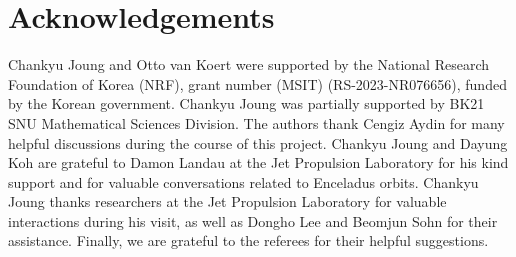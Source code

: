 \documentclass[pdflatex,sn-mathphys-ay]{sn-jnl}%
\theoremstyle{thmstyleone}%
\theoremstyle{thmstyletwo}%
\theoremstyle{thmstylethree}%
\begin{document}
\section*{Acknowledgements}
Chankyu Joung and Otto van Koert were supported by the National Research Foundation of Korea (NRF), grant number (MSIT) (RS-2023-NR076656), funded by the Korean government.
Chankyu Joung was partially supported by BK21 SNU Mathematical Sciences Division.
The authors thank Cengiz Aydin for many helpful discussions during the course of this project. 
Chankyu Joung and Dayung Koh are grateful to Damon Landau at the Jet Propulsion Laboratory for his kind support and for valuable conversations related to Enceladus orbits. 
Chankyu Joung thanks researchers at the Jet Propulsion Laboratory for valuable interactions during his visit, as well as Dongho Lee and Beomjun Sohn for their assistance.
Finally, we are grateful to the referees for their helpful suggestions.

\end{document}
